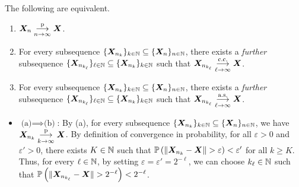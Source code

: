 \begin{enumerate}
\begin{theorem}
\label{thm:subseq-principle}
The following are equivalent.
\begin{enumerate}
\item \(\bm{X}_n\underset{n\to\infty}{\overset{\text{p}}{\longrightarrow}}\bm{X}\).
\item For every subsequence \(\{\bm{X}_{n_{k}}\}_{k\in\mathbb{N}}\subseteq \{\bm{X}_n\}_{n\in\mathbb{N}}\),
there exists a \emph{further} subsequence
\(\{\bm{X}_{n_{k_{\ell}}}\}_{\ell\in\mathbb{N}}\subseteq \{\bm{X}_{n_{k}}\}_{k\in\mathbb{N}}\)
such that \(\bm{X}_{n_{k_{\ell}}}\underset{\ell\to\infty}{\overset{\text{c.c.}}{\longrightarrow}}\bm{X}\).
\item For every subsequence \(\{\bm{X}_{n_{k}}\}_{k\in\mathbb{N}}\subseteq \{\bm{X}_n\}_{n\in\mathbb{N}}\),
there exists a \emph{further} subsequence
\(\{\bm{X}_{n_{k_{\ell}}}\}_{\ell\in\mathbb{N}}\subseteq \{\bm{X}_{n_{k}}\}_{k\in\mathbb{N}}\)
such that \(\bm{X}_{n_{k_{\ell}}}\underset{\ell\to\infty}{\overset{\text{a.s.}}{\longrightarrow}}\bm{X}\).
\end{enumerate}
\end{theorem}
\begin{pf}
\begin{itemize}
\item \(\text{(a)}\implies \text{(b)}\): By (a), for every
subsequence \(\{\bm{X}_{n_{k}}\}_{k\in\mathbb{N}}\subseteq \{\bm{X}_n\}_{n\in\mathbb{N}}\), 
we have \(\bm{X}_{n_k}\underset{k\to\infty}{\overset{\text{p}}{\longrightarrow}}\bm{X}\). By definition of convergence in
probability, for all \(\varepsilon>0\) and \(\varepsilon'>0\), there exists \(K\in\mathbb{N}\)
such that \(\prob{\|\vect{X}_{n_k}-\vect{X}\|>\varepsilon}<\varepsilon'\) for
all \(k\ge K\). Thus, for every \(\ell\in\mathbb{N}\), by setting
\(\varepsilon=\varepsilon'=2^{-\ell}\), we can choose \(k_{\ell}\in\mathbb{N}\) such that
\(\prob{\|\vect{X}_{n_{k_{\ell}}}-\vect{X}\|>2^{-\ell}}<2^{-\ell}\).


\end{itemize}
\end{pf}
\end{enumerate}
